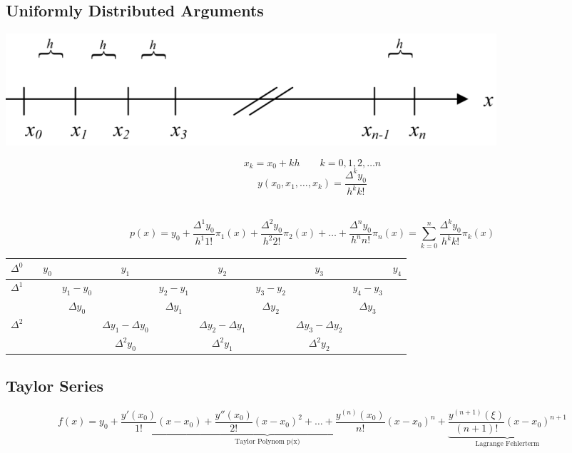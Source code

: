 \subsection{Uniformly Distributed Arguments}

\begin{minipage}[c]{11.0cm}
	\includegraphics[width=0.8\textwidth]{bilder/gleichvArgum.png}
\end{minipage}
\begin{minipage}[c]{6.0cm}
	$$x_k=x_0+k h\qquad k=0,1,2,\ldots n$$
	$$\boxed{y(x_0,x_1,\ldots,x_k)=\frac{\Delta^k y_0}{h^k k!}}$$
\end{minipage}
\hfill\\

$$p(x)=y_0+\frac{\Delta^1 y_0}{h^1 1!}\pi_1(x)+\frac{\Delta^2 y_0}{h^2 2!}\pi_2(x)+\ldots+\frac{\Delta^n y_0}{h^n n!}\pi_n(x)=\sum\limits_{k=0}^{n}{\frac{\Delta^k y_0}{h^k k!}\pi_k(x)}$$

\begin{center}
    \begin{tabular}{|l|lccccccccc|}
        \hline
        $\Delta^0$ && $y_0$ && $y_1$ && $y_2$ && $y_3$ && $y_4$ \\ \hline
        $\Delta^1$ &&   & $y_1-y_0$ && $y_2-y_1$ && $y_3-y_2$ && $y_4-y_3$ & \\
                   &&   & $\Delta y_0$ && $\Delta y_1$ && $\Delta y_2$ && $\Delta y_3$ & \\ \hline
        $\Delta^2$ && && $\Delta y_1-\Delta y_0$ && $\Delta y_2-\Delta y_1$ && $\Delta y_3-\Delta y_2$ && \\
                   && && $\Delta^2 y_0$ && $\Delta^2 y_1$ && $\Delta^2 y_2$ && \\ \hline
    \end{tabular}
\end{center}


\subsection{Taylor Series}
$$f(x)=\underset{\text{Taylor Polynom p(x)}}{\underbrace{y_0+\frac{y'(x_0)}{1!}(x-x_0)+\frac{y''(x_0)}{2!}(x-x_0)^2+\ldots+\frac{y^{(n)}(x_0)}{n!}(x-x_0)^n}}+\underset{\text{Lagrange Fehlerterm}}{\underbrace{\frac{y^{(n+1)}(\xi)}{(n+1)!}(x-x_0)^{n+1}}}$$
